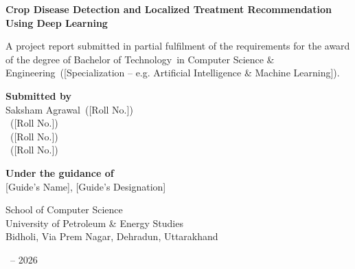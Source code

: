 \documentclass[12pt,a4paper]{article}
\newcommand{\ReportTitle}{Crop Disease Detection and Localized Treatment Recommendation Using Deep Learning}
\newcommand{\DegreeName}{Bachelor of Technology}
\newcommand{\BranchName}{Computer Science \& Engineering}
\newcommand{\SpecializationName}{[Specialization -- e.g. Artificial Intelligence \& Machine Learning]}
\newcommand{\SchoolName}{School of Computer Science}
\newcommand{\UniversityName}{University of Petroleum \& Energy Studies}
\newcommand{\UniversityAddress}{Bidholi, Via Prem Nagar, Dehradun, Uttarakhand}
\newcommand{\SubmissionMonth}{[Month]}
\newcommand{\SubmissionYear}{2026}
\newcommand{\GuideName}{[Guide's Name]}
\newcommand{\GuideDesignation}{[Guide's Designation]}
\newcommand{\StudentAName}{Saksham Agrawal}
\newcommand{\StudentARoll}{[Roll No.]}
\newcommand{\StudentBName}{[Student 2 Name]}
\newcommand{\StudentBRoll}{[Roll No.]}
\newcommand{\StudentCName}{[Student 3 Name]}
\newcommand{\StudentCRoll}{[Roll No.]}
\newcommand{\StudentDName}{[Student 4 Name]}
\newcommand{\StudentDRoll}{[Roll No.]}
\begin{document}

\thispagestyle{empty}
\noindent
{\fontsize{16}{19.2}\selectfont\bfseries \ReportTitle}

\vspace{0.6cm}
\noindent A project report submitted in partial fulfilment of the requirements
for the award of the degree of \DegreeName\ in \BranchName\
(\SpecializationName).

\vspace{0.8cm}
\noindent\textbf{Submitted by}\\[2pt]
\StudentAName\ (\StudentARoll)\\
\StudentBName\ (\StudentBRoll)\\
\StudentCName\ (\StudentCRoll)\\
\StudentDName\ (\StudentDRoll)

\vspace{0.6cm}
\noindent\textbf{Under the guidance of}\\[2pt]
\GuideName, \GuideDesignation

\vspace{0.6cm}
\noindent \SchoolName\\
\UniversityName\\
\UniversityAddress

\vspace{0.4cm}
\noindent \SubmissionMonth\ -- \SubmissionYear

\clearpage
\tableofcontents
\clearpage

\end{document}
